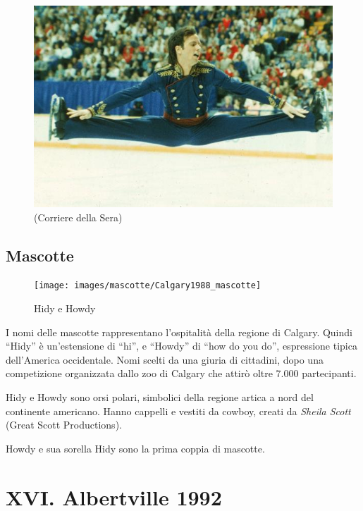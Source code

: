 \documentclass[
]{book}
\begin{document}
\begin{figure}
\includegraphics[width=0.8\linewidth]{images/corriere/1988} \caption{(Corriere della Sera)}\label{fig:unnamed-chunk-50}
\end{figure}

\section*{Mascotte}\label{mascotte-4}

\begin{figure}
\texttt{[image: images/mascotte/Calgary1988\_mascotte]} \caption{Hidy e Howdy}\label{fig:unnamed-chunk-51}
\end{figure}

I nomi delle mascotte rappresentano l'ospitalità della regione di Calgary. Quindi ``Hidy'' è un'estensione di ``hi'', e ``Howdy'' di ``how do you do'', espressione tipica dell'America occidentale. Nomi scelti da una giuria di cittadini, dopo una competizione organizzata dallo zoo di Calgary che attirò oltre 7.000 partecipanti.

Hidy e Howdy sono orsi polari, simbolici della regione artica a nord del continente americano. Hanno cappelli e vestiti da cowboy, creati da \emph{Sheila Scott} (Great Scott Productions).

Howdy e sua sorella Hidy sono la prima coppia di mascotte.

\chapter*{XVI. Albertville 1992}\label{xvi.-albertville-1992}
\end{document}
